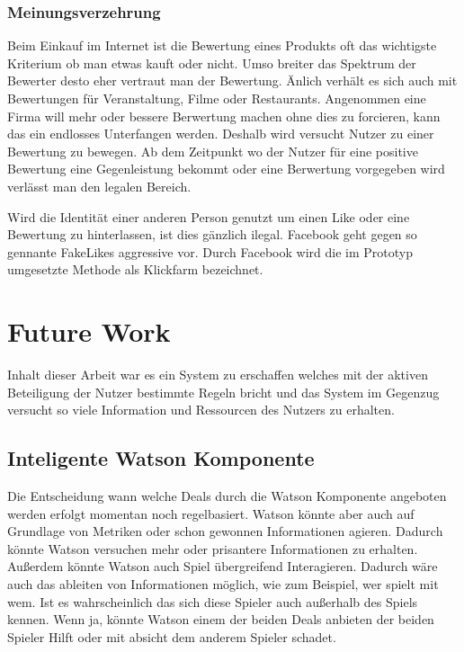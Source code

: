 \documentclass[german]{cgspaper} %
\begin{document}
\subsubsection{Meinungsverzehrung}

Beim Einkauf im Internet ist die Bewertung eines Produkts oft das wichtigste Kriterium ob man etwas kauft oder nicht.
Umso breiter das Spektrum der Bewerter desto eher vertraut man der Bewertung.
Änlich verhält es sich auch mit Bewertungen für Veranstaltung, Filme oder Restaurants.
Angenommen eine Firma will mehr oder bessere Berwertung machen ohne dies zu forcieren, kann das ein endlosses Unterfangen werden.
Deshalb wird versucht Nutzer zu einer Bewertung zu bewegen.
Ab dem Zeitpunkt wo der Nutzer für eine positive Bewertung eine Gegenleistung bekommt oder eine Berwertung vorgegeben wird verlässt man den legalen Bereich.

Wird die Identität einer anderen Person genutzt um einen Like oder eine Bewertung zu hinterlassen, ist dies gänzlich ilegal.
Facebook geht gegen so gennante FakeLikes aggressive vor.
Durch Facebook wird die im Prototyp umgesetzte Methode als Klickfarm bezeichnet. \cite{FakeLikes2018}

\section{Future Work}

Inhalt dieser Arbeit war es ein System zu erschaffen welches mit der aktiven Beteiligung der Nutzer bestimmte Regeln bricht und das System im Gegenzug versucht so viele Information und Ressourcen des Nutzers zu erhalten.

\subsection{Inteligente Watson Komponente}

Die Entscheidung wann welche Deals durch die Watson Komponente angeboten werden erfolgt momentan noch regelbasiert.
Watson könnte aber auch auf Grundlage von Metriken oder schon gewonnen Informationen agieren.
Dadurch könnte Watson versuchen mehr oder prisantere Informationen zu erhalten.
Außerdem könnte Watson auch Spiel übergreifend Interagieren.
Dadurch wäre auch das ableiten von Informationen möglich, wie zum Beispiel, wer spielt mit wem.
Ist es wahrscheinlich das sich diese Spieler auch außerhalb des Spiels kennen.
Wenn ja, könnte Watson einem der beiden Deals anbieten der beiden Spieler Hilft oder mit absicht dem anderem Spieler schadet.
\end{document}
